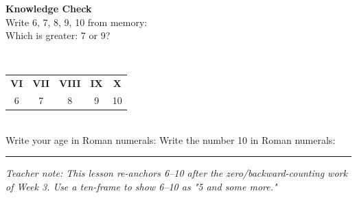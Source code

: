 \documentclass[12pt,letterpaper]{article}
\begin{document}
\goldrule

\begin{checkbox}
\noindent\textbf{\color{sd-green}Knowledge Check}\\[4pt]
\setcounter{probnum}{0}
\prob Write 6, 7, 8, 9, 10 from memory: \quad\ansblank\quad\ansblank\quad\ansblank\quad\ansblank\quad\ansblank\\[8pt]
\prob Which is greater: 7 or 9? \quad\ansblank
\end{checkbox}

\vfill
{}\\[4pt]
\begin{tabular}{ccccc}
\textbf{VI}&\textbf{VII}&\textbf{VIII}&\textbf{IX}&\textbf{X}\\
6 & 7 & 8 & 9 & 10
\end{tabular}\\[4pt]
Write your age in Roman numerals: \quad\ansblank \quad
Write the number 10 in Roman numerals: \quad\ansblank

\vspace{4pt}\hrule\vspace{3pt}
{\footnotesize\color{gray}\textit{Teacher note: This lesson re-anchors 6–10 after the zero/backward-counting work of Week 3.
  Use a ten-frame to show 6–10 as "5 and some more."}}
\end{document}
